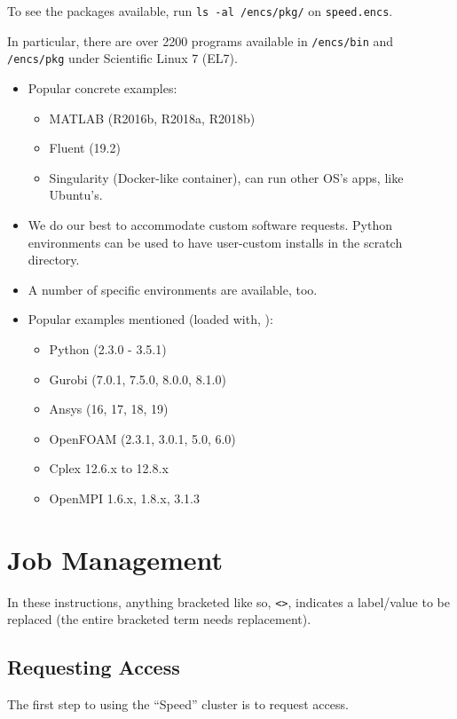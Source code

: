 \documentclass{easychair}
\begin{document}
To see the packages available, run \texttt{ls -al /encs/pkg/} on \texttt{speed.encs}.


In particular, there are over 2200 programs available in
\texttt{/encs/bin} and \texttt{/encs/pkg} under Scientific Linux 7 (EL7).

\begin{itemize}
	\item 
Popular concrete examples:
\begin{itemize}
	\item 
MATLAB (R2016b, R2018a, R2018b)
	\item 
Fluent (19.2)
	\item 
Singularity (Docker-like container), can run other OS's apps, like Ubuntu's.
\end{itemize}
	\item 
We do our best to accommodate custom software requests.
Python environments can be used to have user-custom installs
in the scratch directory.
	\item 
A number of specific environments are available, too.
	\item 
Popular examples mentioned (loaded with, ):
\begin{itemize}
	\item 
Python (2.3.0 - 3.5.1)
	\item 
Gurobi (7.0.1, 7.5.0, 8.0.0, 8.1.0)
	\item 
Ansys (16, 17, 18, 19)
	\item 
OpenFOAM (2.3.1, 3.0.1, 5.0, 6.0)
	\item 
Cplex 12.6.x to 12.8.x
	\item 
OpenMPI 1.6.x, 1.8.x, 3.1.3
\end{itemize}
\end{itemize}


\section{Job Management}
\label{sect:job-management}

In these instructions, anything bracketed like so, \verb+<>+, indicates a
label/value to be replaced (the entire bracketed term needs replacement).

\subsection*{Requesting Access}
The first step to using the ``Speed'' cluster is to request access. 
\end{document}
